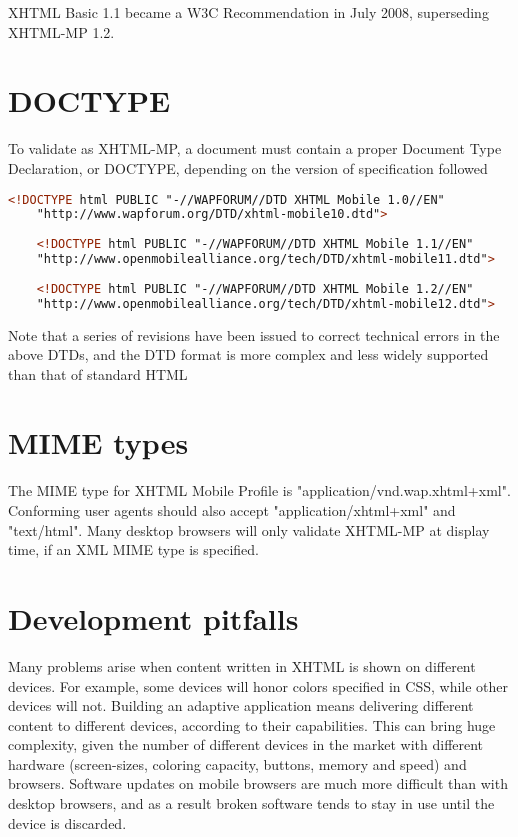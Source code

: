 XHTML Basic 1.1 became a W3C Recommendation in July 2008, superseding XHTML-MP 1.2.

\section{DOCTYPE}

To validate as XHTML-MP, a document must contain a proper Document Type Declaration, or DOCTYPE, depending on the version of specification followed

\begin{lstlisting}[language=HTML]
	<!DOCTYPE html PUBLIC "-//WAPFORUM//DTD XHTML Mobile 1.0//EN"
	"http://www.wapforum.org/DTD/xhtml-mobile10.dtd">
	 
	<!DOCTYPE html PUBLIC "-//WAPFORUM//DTD XHTML Mobile 1.1//EN"
	"http://www.openmobilealliance.org/tech/DTD/xhtml-mobile11.dtd">
	 
	<!DOCTYPE html PUBLIC "-//WAPFORUM//DTD XHTML Mobile 1.2//EN"
	"http://www.openmobilealliance.org/tech/DTD/xhtml-mobile12.dtd">
\end{lstlisting}


Note that a series of revisions have been issued to correct technical errors in the above DTDs, and the DTD format is more complex and less widely supported than that of standard HTML

\section{MIME types}

The MIME type for XHTML Mobile Profile is "application/vnd.wap.xhtml+xml". Conforming user agents should also accept "application/xhtml+xml" and "text/html". Many desktop browsers will only validate XHTML-MP at display time, if an XML MIME type is specified.



\section{Development pitfalls}

Many problems arise when content written in XHTML is shown on different devices. For example, some devices will honor colors specified in CSS, while other devices will not. Building an adaptive application means delivering different content to different devices, according to their capabilities. This can bring huge complexity, given the number of different devices in the market with different hardware (screen-sizes, coloring capacity, buttons, memory and speed) and browsers. Software updates on mobile browsers are much more difficult than with desktop browsers, and as a result broken software tends to stay in use until the device is discarded.



